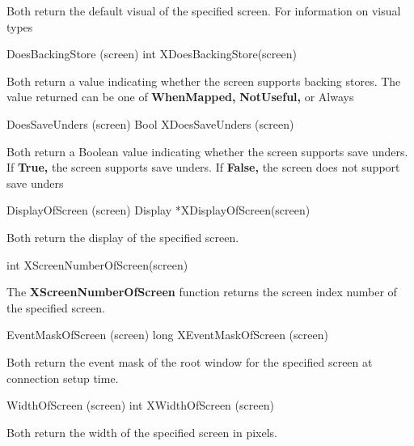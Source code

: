 \documentclass{report}
\begin{document}
\begin{itemize}
            Both return the default visual of the specified screen. For information on visual types
            \bigbreak \noindent 
            \begin{cppcode}
                DoesBackingStore (screen)
                int XDoesBackingStore(screen)
            \end{cppcode}
            \bigbreak \noindent 
            Both return a value indicating whether the screen supports backing stores. The value returned can be one of \textbf{WhenMapped,} \textbf{NotUseful,} or Always 
            \bigbreak \noindent 
            \begin{cppcode}
                DoesSaveUnders (screen)
                Bool XDoesSaveUnders (screen)
            \end{cppcode}
            \bigbreak \noindent 
            Both return a Boolean value indicating whether the screen supports save unders. If \textbf{True,} the screen supports save unders. If \textbf{False,} the screen does not support save unders 
            \bigbreak \noindent 
            \begin{cppcode}
                DisplayOfScreen (screen)
                Display *XDisplayOfScreen(screen)
            \end{cppcode}
            \bigbreak \noindent 
            Both return the display of the specified screen.
            \bigbreak \noindent 
            \begin{cppcode}
                int XScreenNumberOfScreen(screen)
            \end{cppcode}
            \bigbreak \noindent 
            The \textbf{XScreenNumberOfScreen} function returns the screen index number of the specified screen.
            \bigbreak \noindent 
            \begin{cppcode}
                EventMaskOfScreen (screen)
                long XEventMaskOfScreen (screen)
            \end{cppcode}
            \bigbreak \noindent 
            Both return the event mask of the root window for the specified screen at connection setup time.
            \bigbreak \noindent 
            \begin{cppcode}
                WidthOfScreen (screen)
                int XWidthOfScreen (screen)
            \end{cppcode}
            \bigbreak \noindent 
            Both return the width of the specified screen in pixels.
            \bigbreak \noindent 
            \begin{cppcode}

\end{cppcode}
\end{itemize}
\end{document}
